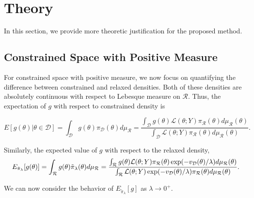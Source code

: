 \documentclass[10pt,fleqn]{article} \pdfoutput=1
\DeclareMathOperator{\1}{\mathbbm{1}} \DeclareMathOperator{\bigO}{\mc O}
\begin{document}
\section{Theory} 

In this section, we provide more theoretic justification for the proposed
method.

\subsection{Constrained
	Space with Positive Measure } \label{SEC:Positive_measure_theory}

	For constrained space with positive measure, we now focus on
	quantifying the difference between constrained and relaxed
	densities.  Both of these densities are absolutely continuous with respect to Lebesque
measure on $\mathcal{R}$.  Thus, the expectation of $g$ with respect to
constrained density is 

\begin{equation}
	\label{EQ:Expectation_Positive_Measure_Constraint}
	E[g(\theta)|\theta\in\mathcal{D}] = \int_\mathcal{D}
	g(\theta)\pi_\mathcal{D}(\theta)d\mu_\mathcal{R} =
	\frac{\int_\mathcal{D} g(\theta)\mathcal{L}(\theta; Y)
		\pi_\mathcal{R}(\theta)d\mu_\mathcal{R}(\theta)}{\int_\mathcal{D}
		\mathcal{L}(\theta; Y) \pi_\mathcal{R}(\theta)d\mu_\mathcal{R}(\theta)}.
\end{equation} 

Similarly, the expected value of $g$ with respect to the
relaxed density, 
\begin{equation} \label{EQ:Expectation_Positive_Measure_Relaxed}
	E_{\tilde{\pi}_\lambda}[g(\theta)] = \int_\mathcal{R}
	g(\theta)\tilde{\pi}_\lambda(\theta)d\mu_\mathcal{R} =
	\frac{\int_\mathcal{R} g(\theta)\mathcal{L}(\theta; Y)
		\pi_\mathcal{R}(\theta)
		\exp(-v_{\mathcal{D}}(\theta)/\lambda)d\mu_\mathcal{R}(\theta)}{\int_\mathcal{R}
		\mathcal{L}(\theta; Y)\exp(-v_{\mathcal{D}}(\theta)/\lambda)
		\pi_\mathcal{R}(\theta)d\mu_\mathcal{R}(\theta)}.\end{equation}

We can now consider the behavior of $E_{\tilde{\pi}_\lambda}[g]$ as
$\lambda \to 0^+.$
\end{document}
